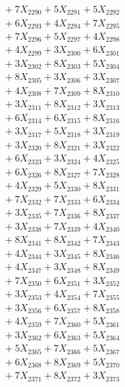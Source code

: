 \documentclass[a4paper,10pt]{article}
\begin{document}
{\begin{align}
&\;  + 7 X_{2290} + 5 X_{2291} + 5 X_{2292} \\[0.3ex]
&\;  + 6 X_{2293} + 4 X_{2294} + 7 X_{2295} \\[0.3ex]
&\;  + 7 X_{2296} + 5 X_{2297} + 4 X_{2298} \\[0.3ex]
&\;  + 4 X_{2299} + 3 X_{2300} + 6 X_{2301} \\[0.3ex]
&\;  + 3 X_{2302} + 8 X_{2303} + 5 X_{2304} \\[0.3ex]
&\;  + 8 X_{2305} + 3 X_{2306} + 3 X_{2307} \\[0.3ex]
&\;  + 4 X_{2308} + 7 X_{2309} + 8 X_{2310} \\[0.3ex]
&\;  + 3 X_{2311} + 8 X_{2312} + 3 X_{2313} \\[0.3ex]
&\;  + 6 X_{2314} + 6 X_{2315} + 8 X_{2316} \\[0.3ex]
&\;  + 3 X_{2317} + 5 X_{2318} + 3 X_{2319} \\[0.5ex]\allowbreak
&\;  + 3 X_{2320} + 8 X_{2321} + 3 X_{2322} \\[0.3ex]
&\;  + 6 X_{2323} + 3 X_{2324} + 4 X_{2325} \\[0.3ex]
&\;  + 6 X_{2326} + 8 X_{2327} + 7 X_{2328} \\[0.3ex]
&\;  + 4 X_{2329} + 5 X_{2330} + 8 X_{2331} \\[0.3ex]
&\;  + 7 X_{2332} + 7 X_{2333} + 6 X_{2334} \\[0.3ex]
&\;  + 3 X_{2335} + 7 X_{2336} + 8 X_{2337} \\[0.3ex]
&\;  + 3 X_{2338} + 7 X_{2339} + 4 X_{2340} \\[0.3ex]
&\;  + 8 X_{2341} + 8 X_{2342} + 7 X_{2343} \\[0.3ex]
&\;  + 4 X_{2344} + 3 X_{2345} + 8 X_{2346} \\[0.3ex]
&\;  + 4 X_{2347} + 3 X_{2348} + 8 X_{2349} \\[0.5ex]\allowbreak
&\;  + 7 X_{2350} + 6 X_{2351} + 3 X_{2352} \\[0.3ex]
&\;  + 3 X_{2353} + 4 X_{2354} + 7 X_{2355} \\[0.3ex]
&\;  + 3 X_{2356} + 6 X_{2357} + 8 X_{2358} \\[0.3ex]
&\;  + 4 X_{2359} + 7 X_{2360} + 5 X_{2361} \\[0.3ex]
&\;  + 3 X_{2362} + 6 X_{2363} + 5 X_{2364} \\[0.3ex]
&\;  + 5 X_{2365} + 7 X_{2366} + 5 X_{2367} \\[0.3ex]
&\;  + 6 X_{2368} + 8 X_{2369} + 5 X_{2370} \\[0.3ex]
&\;  + 7 X_{2371} + 8 X_{2372} + 3 X_{2373} \\[0.3ex]

\end{align}}
\end{document}
